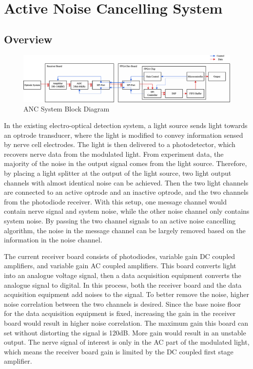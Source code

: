 \chapter[Active noise cancelling design]{Active Noise Cancelling System} \label{c:tc1} 


\section{Overview}

\begin{figure}[!ht]
\centering
\includegraphics[width=0.9\linewidth]{4-ANC_Sys/ANCBlockDiagram.pdf}
\caption{ANC System Block Diagram}
\label{fig_ANCBlockDiagram}
\end{figure}

In the existing electro-optical detection system, a light source sends light towards an optrode transducer, where the light is modified to convey information sensed by nerve cell electrodes. The light is then delivered to a photodetector, which recovers nerve data from the modulated light.  From experiment data, the majority of the noise in the output signal comes from the light source.  Therefore, by placing a light splitter at the output of the light source, two light output channels with almost identical noise can be achieved.  Then the two light channels are connected to an active optrode and an inactive optrode, and the two channels from the photodiode receiver.  With this setup, one message channel would contain nerve signal and system noise, while the other noise channel only contains system noise.  By passing the two channel signals to an active noise cancelling algorithm, the noise in the message channel can be largely removed based on the information in the noise channel.

The current receiver board consists of photodiodes, variable gain DC coupled amplifiers, and variable gain AC coupled amplifiers.  This board converts light into an analogue voltage signal, then a data acquisition equipment converts the analogue signal to digital.  In this process, both the receiver board and the data acquisition equipment add noises to the signal.  To better remove the noise, higher noise correlation between the two channels is desired.  Since the base noise floor for the data acquisition equipment is fixed, increasing the gain in the receiver board would result in higher noise correlation.  The maximum gain this board can set without distorting the signal is 120dB.  More gain would result in an unstable output.  The nerve signal of interest is only in the AC part of the modulated light, which means the receiver board gain is limited by the DC coupled first stage amplifier.  

